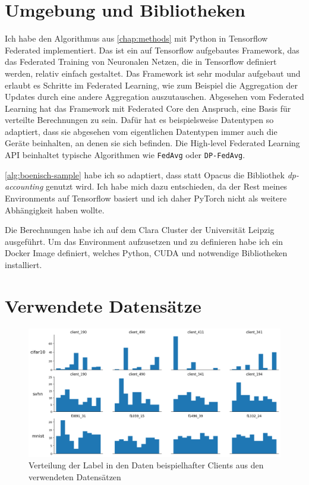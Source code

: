 \section{Umgebung und Bibliotheken}
Ich habe den Algorithmus aus \autoref{chap:methods} mit Python in Tensorflow Federated implementiert. Das ist ein auf Tensorflow aufgebautes Framework, das das Federated Training von Neuronalen Netzen, die in Tensorflow definiert werden, relativ einfach gestaltet. Das Framework ist sehr modular aufgebaut und erlaubt es Schritte im Federated Learning, wie zum Beispiel die Aggregation der Updates durch eine andere Aggregation auszutauschen. Abgesehen vom Federated Learning hat das Framework mit Federated Core den Anspruch, eine Basis für verteilte Berechnungen zu sein. Dafür hat es beispielsweise Datentypen so adaptiert, dass sie abgesehen vom eigentlichen Datentypen immer auch die Geräte beinhalten, an denen sie sich befinden. Die High-level Federated Learning API beinhaltet typische Algorithmen wie \texttt{FedAvg} oder \texttt{DP-FedAvg}.

\autoref{alg:boenisch-sample} habe ich so adaptiert, dass statt Opacus die Bibliothek \textit{dp-accounting} genutzt wird. Ich habe mich dazu entschieden, da der Rest meines Environments auf Tensorflow basiert und ich daher PyTorch nicht als weitere Abhängigkeit haben wollte.

Die Berechnungen habe ich auf dem Clara Cluster der Universität Leipzig ausgeführt. Um das Environment aufzusetzen und zu definieren habe ich ein Docker Image definiert, welches Python, CUDA und notwendige Bibliotheken installiert.

\section{Verwendete Datensätze}

\begin{figure}[tb]
	\centering
	\includegraphics[width=\textwidth]{Bilder/label_distribution.png}
	\caption{Verteilung der Label in den Daten beispielhafter Clients aus den verwendeten Datensätzen}
	\label{fig:label-distribution}
\end{figure}

